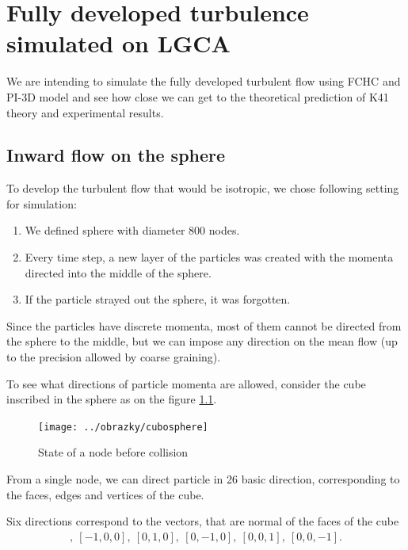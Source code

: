 \chapter{Fully developed turbulence simulated on LGCA}

We are intending to simulate the fully developed turbulent flow using FCHC and PI-3D model and see how close we can get to the theoretical prediction of K41 theory and experimental results.

\section{Inward flow on the sphere}
%
%


To develop the turbulent flow that would be isotropic, we chose following setting for simulation:
\begin{enumerate}
\item We defined sphere with diameter 800 nodes.
\item Every time step, a new layer of the particles was created with the momenta directed into the middle of the sphere.
\item If the particle strayed out the sphere, it was forgotten. 
\end{enumerate}

Since the particles have discrete momenta, most of them cannot be directed from the sphere to the middle, but we can impose any direction on the mean flow (up to the precision allowed by coarse graining).

To see what directions of particle momenta are allowed, consider the cube inscribed in the sphere as on the figure \ref{cubosphere}.
\begin{figure}[htbp] 
 \centering 
 \texttt{[image: ../obrazky/cubosphere]}
 \label{cubosphere}
 \caption{State of a node before collision}
\end{figure}
 
From a single node, we can direct particle in 26 basic direction, corresponding to the faces, edges and vertices of the cube.  

Six directions correspond to the vectors, that are normal of the faces of the cube
\begin{align}
[1,0,0],~[-1,0,0],~[0,1,0],~[0,-1,0],~[0,0,1],~[0,0,-1].
\end{align}


